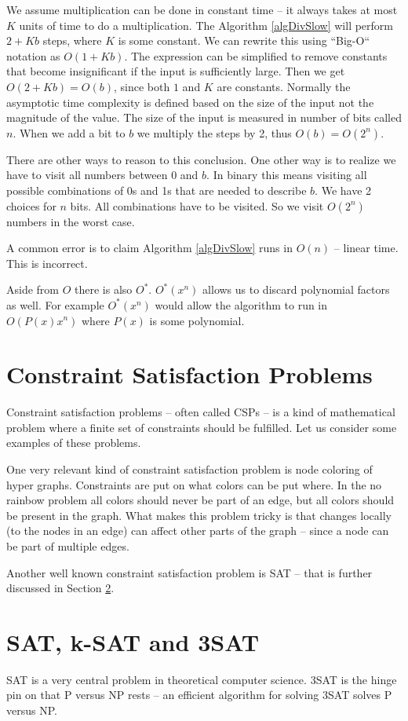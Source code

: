 \documentclass[msc,lith,english]{liuthesis}
\begin{document}
We assume multiplication can be done in constant time -- it always takes at most $K$ units of time to do a multiplication.
The Algorithm \ref{algDivSlow} will perform $ 2 + Kb $ steps, where $K$ is some
constant. We can rewrite this using ``Big-O`` notation as $O(1 + Kb)$. The expression can be
simplified to remove constants that become insignificant if the
input is sufficiently large. Then we get $O(2 + Kb) = O(b)$, since both $1$ and $K$ are constants. 
Normally the asymptotic time complexity is defined based on the size of the input not the magnitude of the value.
The size of the input is measured in number of bits called $n$. When we add a bit to $b$ we multiply the steps by 2,
thus $O(b) = O(2^n)$.

There are other ways to reason to this conclusion.
One other way is to realize we have to visit all numbers between $0$ and $b$.
In binary this means visiting all possible combinations of 0s and 1s that are needed to describe $b$.
We have 2 choices for $n$ bits. All combinations have to be visited. So we visit $O(2^n)$ numbers in the worst case. 

A common error is to claim Algorithm \ref{algDivSlow} runs in $O(n)$ -- linear time. This is incorrect.

Aside from $O$ there is also $O^*$. $O^*(x^n)$ allows us to discard polynomial factors as well. For example $O^*(x^n)$ would allow the algorithm to run in $O(P(x)x^n)$ where $P(x)$ is some polynomial.

\section{Constraint Satisfaction Problems}
Constraint satisfaction problems -- often called CSPs -- is a kind of mathematical problem where a finite set of constraints should be fulfilled. Let us consider some examples of these problems.

One very relevant kind of constraint satisfaction problem is node coloring of hyper graphs.
Constraints are put on what colors can be put where. In the no rainbow problem all colors should never be part of an edge, but all colors should be present in the graph. What makes this problem tricky is that changes locally (to the nodes in an edge) can affect other parts of the graph -- since a node can be part of multiple edges.

Another well known constraint satisfaction problem is SAT -- that is further discussed in Section \ref{secSAT}.

\section{SAT, k-SAT and 3SAT}\label{secSAT}
SAT is a very central problem in theoretical computer science. 3SAT is the
hinge pin on that P versus NP rests -- an efficient algorithm for solving 3SAT
solves P versus NP.
\end{document}
